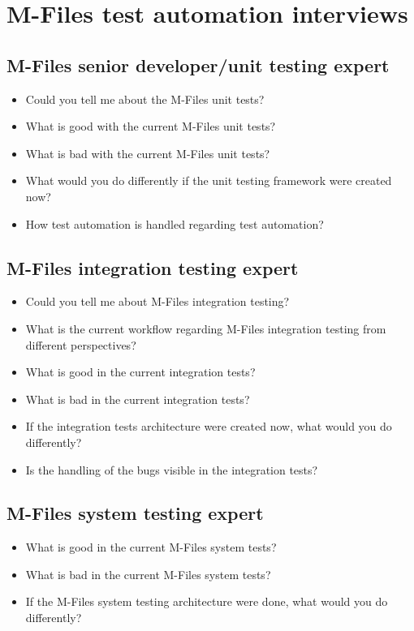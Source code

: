 \section{M-Files test automation interviews}

\subsection*{M-Files senior developer/unit testing expert}
\begin{itemize}[noitemsep]
	\item Could you tell me about the M-Files unit tests?
	\item What is good with the current M-Files unit tests?
	\item What is bad with the current M-Files unit tests?
	\item What would you do differently if the unit testing framework were created now?
	\item How test automation is handled regarding test automation?
\end{itemize}

\subsection*{M-Files integration testing expert}
\begin{itemize}[noitemsep]
	\item Could you tell me about M-Files integration testing?
	\item What is the current workflow regarding M-Files integration testing from different perspectives?
	\item What is good in the current integration tests?
	\item What is bad in the current integration tests?
	\item If the integration tests architecture were created now, what would you do differently?
	\item Is the handling of the bugs visible in the integration tests?
\end{itemize}

\subsection*{M-Files system testing expert}
\begin{itemize}[noitemsep]
	\item What is good in the current M-Files system tests?
	\item What is bad in the current M-Files system tests?
	\item If the M-Files system testing architecture were done, what would you do differently?
\end{itemize}

